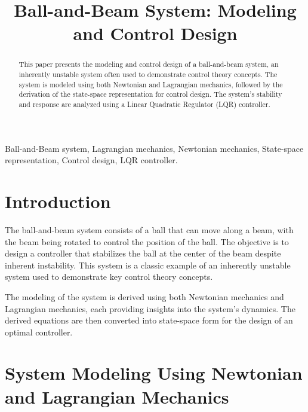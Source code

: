 \documentclass[conference]{IEEEtran}
\begin{document}
\title{Ball-and-Beam System: Modeling and Control Design}

\author{
}

\maketitle

\begin{abstract}
This paper presents the modeling and control design of a ball-and-beam system, an inherently unstable system often used to demonstrate control theory concepts. The system is modeled using both Newtonian and Lagrangian mechanics, followed by the derivation of the state-space representation for control design. The system's stability and response are analyzed using a Linear Quadratic Regulator (LQR) controller.
\end{abstract}

\begin{IEEEkeywords}
Ball-and-Beam system, Lagrangian mechanics, Newtonian mechanics, State-space representation, Control design, LQR controller.
\end{IEEEkeywords}

\section{Introduction}
The ball-and-beam system consists of a ball that can move along a beam, with the beam being rotated to control the position of the ball. The objective is to design a controller that stabilizes the ball at the center of the beam despite inherent instability. This system is a classic example of an inherently unstable system used to demonstrate key control theory concepts.

The modeling of the system is derived using both Newtonian mechanics and Lagrangian mechanics, each providing insights into the system's dynamics. The derived equations are then converted into state-space form for the design of an optimal controller.

\section{System Modeling Using Newtonian and Lagrangian Mechanics}
\end{document}
